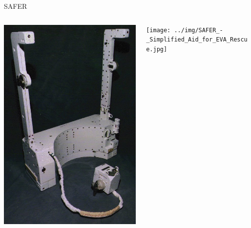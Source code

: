 \documentclass[10pt]{beamer}
\begin{document}
\begin{frame}[fragile]{SAFER}
  \begin{columns}[T]
    \begin{column}{.5\textwidth}
      \hfill
      \includegraphics[height=1.3\textwidth]{../img/SAFER_-_Simplified_Aid_for_EVA_Rescue_2.jpg}
    \end{column}%
    \begin{column}{.5\textwidth}
      \texttt{[image: ../img/SAFER\_-\_Simplified\_Aid\_for\_EVA\_Rescue.jpg]}
    \end{column}
  \end{columns}
\end{frame}
\end{document}
